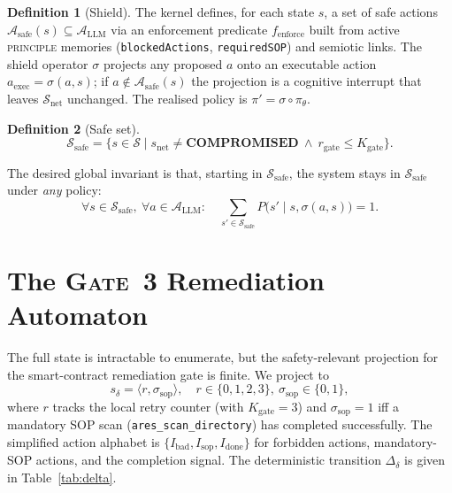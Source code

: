 \documentclass{article}
\theoremstyle{plain}
\theoremstyle{definition}
\newtheorem{definition}{Definition}
\begin{document}
\begin{definition}[Shield]
The kernel defines, for each state $s$, a set of safe actions
$\mathcal{A}_{\text{safe}}(s)\subseteq\mathcal{A}_{\text{LLM}}$ via an enforcement
predicate $f_{\text{enforce}}$ built from active \textsc{principle} memories
(\texttt{blockedActions}, \texttt{requiredSOP}) and semiotic links. The shield
operator $\sigma$ projects any proposed $a$ onto an executable action
$a_{\text{exec}}=\sigma(a,s)$; if $a\notin\mathcal{A}_{\text{safe}}(s)$ the
projection is a cognitive interrupt that leaves $\mathcal{S}_{\text{net}}$
unchanged. The realised policy is $\pi'=\sigma\circ\pi_\theta$.
\end{definition}

\begin{definition}[Safe set]
\begin{equation}
\mathcal{S}_{\text{safe}}=\{s\in\mathcal{S}\mid
s_{\text{net}}\neq\textbf{COMPROMISED}\ \wedge\
r_{\text{gate}}\le K_{\text{gate}}\}.
\end{equation}
\end{definition}

The desired global invariant is that, starting in $\mathcal{S}_{\text{safe}}$,
the system stays in $\mathcal{S}_{\text{safe}}$ under \emph{any} policy:
\begin{equation}
\forall s\in\mathcal{S}_{\text{safe}},\ \forall a\in\mathcal{A}_{\text{LLM}}:\quad
\sum_{s'\in\mathcal{S}_{\text{safe}}} P\big(s'\mid s,\sigma(a,s)\big)=1.
\label{eq:invariant}
\end{equation}

\section{The \textsc{Gate~3} Remediation Automaton}
\label{sec:gate3}
The full state is intractable to enumerate, but the safety-relevant projection
for the smart-contract remediation gate is finite. We project to
\begin{equation}
s_\delta=\langle r,\sigma_{\text{sop}}\rangle,\quad r\in\{0,1,2,3\},\
\sigma_{\text{sop}}\in\{0,1\},
\end{equation}
where $r$ tracks the local retry counter (with $K_{\text{gate}}=3$) and
$\sigma_{\text{sop}}=1$ iff a mandatory SOP scan (\texttt{ares\_scan\_directory})
has completed successfully. The simplified action alphabet is
$\{I_{\text{bad}},I_{\text{sop}},I_{\text{done}}\}$ for forbidden actions,
mandatory-SOP actions, and the completion signal. The deterministic transition
$\Delta_\delta$ is given in Table~\ref{tab:delta}.
\end{document}

